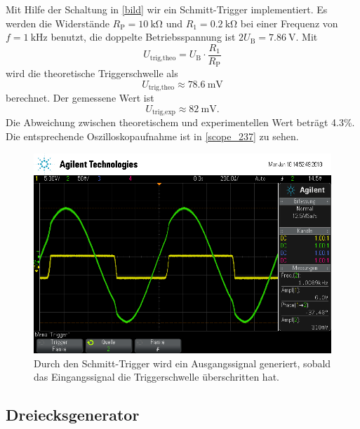Mit Hilfe der Schaltung in \autoref{bild} wir ein Schmitt-Trigger implementiert. Es werden die Widerstände $R_\text{P} = \SI{10}{\kilo\ohm}$ und $R_\text{1} = \SI{0.2}{\kilo\ohm}$ bei einer Frequenz von $f = \SI{1}{\kilo\hertz}$ benutzt, die doppelte Betriebsspannung ist $2U_\text{B} = \SI{7.86}{\volt}$. Mit
\begin{equation}
	U_\text{trig,theo} = U_\text{B} \cdot \frac{R_1}{R_\text{P}}
\end{equation}
wird die theoretische Triggerschwelle als
\begin{equation*}
	U_\text{trig,theo} \approx \SI{78.6}{\milli\volt}
\end{equation*}
berechnet. Der gemessene Wert ist
\begin{equation*}
	U_\text{trig,exp} \approx \SI{82}{\milli\volt}.
\end{equation*}
Die Abweichung zwischen theoretischem und experimentellen Wert beträgt 4.3\%. Die entsprechende Oszilloskopaufnahme ist in \autoref{scope_237} zu sehen.
\begin{figure}[h]
	\centering
	\includegraphics[width=\textwidth]{usb/scope_237.png}
	\caption{Durch den Schmitt-Trigger wird ein Ausgangssignal generiert, sobald das Eingangssignal die Triggerschwelle überschritten hat.}
	\label{scope_237}
\end{figure}

\FloatBarrier

\subsection{Dreiecksgenerator}

